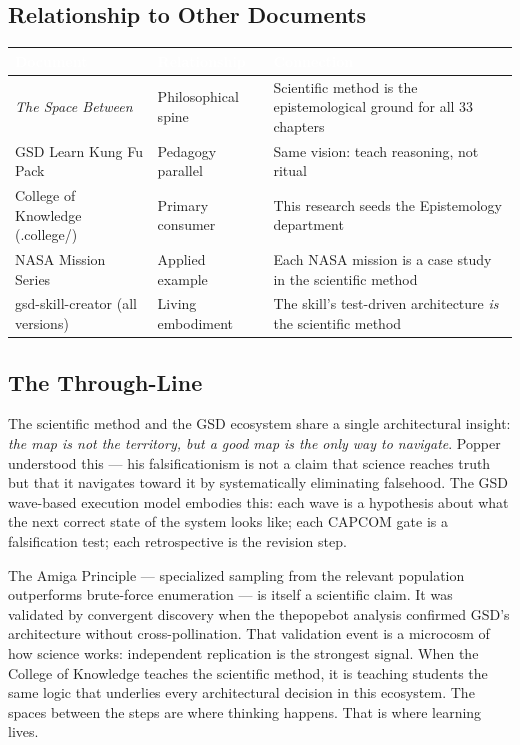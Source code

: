 \documentclass[11pt,letterpaper]{article}
\newcommand{\tableheader}[1]{\textbf{\sffamily\textcolor{white}{#1}}}
\begin{document}
\subsection{Relationship to Other Documents}

\begin{center}
\begin{tabularx}{\textwidth}{L{4.5cm}L{4cm}X}
\toprule
{}
\tableheader{Document} & \tableheader{Relationship} & \tableheader{Connection} \\
\midrule
\emph{The Space Between} & Philosophical spine & Scientific method is the epistemological ground for all 33 chapters \\
GSD Learn Kung Fu Pack & Pedagogy parallel & Same vision: teach reasoning, not ritual \\
College of Knowledge (.college/) & Primary consumer & This research seeds the Epistemology department \\
NASA Mission Series & Applied example & Each NASA mission is a case study in the scientific method \\
gsd-skill-creator (all versions) & Living embodiment & The skill's test-driven architecture \emph{is} the scientific method \\
\bottomrule
\end{tabularx}
\end{center}

\subsection{The Through-Line}

The scientific method and the GSD ecosystem share a single architectural insight: \emph{the map is not the territory, but a good map is the only way to navigate}. Popper understood this --- his falsificationism is not a claim that science reaches truth but that it navigates toward it by systematically eliminating falsehood. The GSD wave-based execution model embodies this: each wave is a hypothesis about what the next correct state of the system looks like; each CAPCOM gate is a falsification test; each retrospective is the revision step.

The Amiga Principle --- specialized sampling from the relevant population outperforms brute-force enumeration --- is itself a scientific claim. It was validated by convergent discovery when the thepopebot analysis confirmed GSD's architecture without cross-pollination. That validation event is a microcosm of how science works: independent replication is the strongest signal. When the College of Knowledge teaches the scientific method, it is teaching students the same logic that underlies every architectural decision in this ecosystem. The spaces between the steps are where thinking happens. That is where learning lives.
\end{document}
